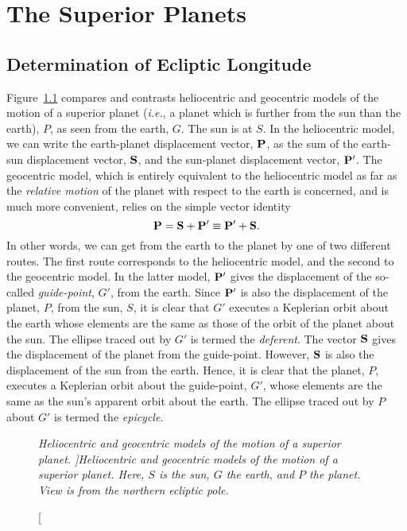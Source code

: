 \chapter{The Superior Planets}\label{csup}
\section{Determination of Ecliptic Longitude}
Figure~\ref{vf7} compares and contrasts heliocentric and geocentric
models of the
motion  of a superior planet ({\em i.e.}, a planet which is further from the
sun than the earth), $P$,  as seen from the earth, $G$. The sun is
at $S$. In the heliocentric
model, we can write the earth-planet displacement vector, ${\bf P}$,
as the sum of the earth-sun displacement vector, ${\bf S}$, and
the sun-planet displacement vector, ${\bf P}'$.  The geocentric model,
which is entirely equivalent to the heliocentric model as far as
the {\em relative motion}\/ of the planet with respect to the
earth is concerned, and is much more convenient,  relies on the simple vector identity
\begin{equation}\label{ve2.15}
{\bf P} = {\bf S}+{\bf P}' \equiv{\bf P}'+{\bf S}.
\end{equation}
In other words, we can get from the earth to the planet by one of two
different routes. The first route corresponds to the heliocentric model, and
the second to the geocentric model.
In the latter model, ${\bf P}'$ gives the displacement of
the so-called {\em guide-point}, $G'$, from the earth. 
Since ${\bf P}'$ is also the displacement of the planet, $P$, from the
sun, $S$, it is clear that  $G'$ executes a
Keplerian orbit about the earth whose  elements are the
same as those of the orbit of the planet about the sun.
 The ellipse traced out by $G'$ is termed the {\em deferent}. The vector ${\bf S}$ gives
the displacement of the planet from the guide-point.
However, ${\bf S}$ is also the displacement of the sun from the earth.
Hence, it is clear that the planet, $P$,
executes a Keplerian orbit about the guide-point, $G'$, whose
 elements are the same as the sun's apparent orbit about the earth.
 The ellipse traced out by $P$ about $G'$ is termed the {\em epicycle}. 
\begin{figure}[h]
\epsfysize=2.75in
\centerline{}
\caption[\em Heliocentric and geocentric models of the motion of a superior planet. ]{\em Heliocentric and geocentric models of the motion of a superior planet. Here, $S$ is the sun, $G$ the earth, and $P$ the planet. View is from the northern ecliptic pole.}\label{vf7}   
\end{figure}
 
